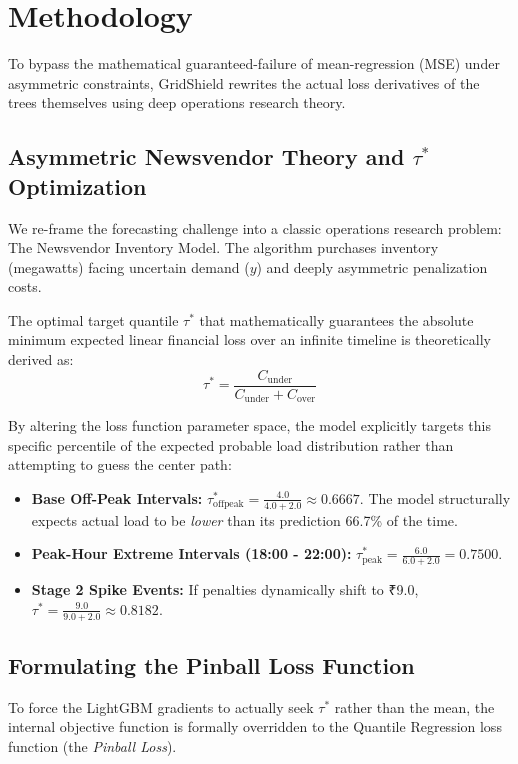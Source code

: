 \documentclass[11pt,a4paper]{article}
\begin{document}
\section{Methodology}

To bypass the mathematical guaranteed-failure of mean-regression (MSE) under asymmetric constraints, GridShield rewrites the actual loss derivatives of the trees themselves using deep operations research theory.

\subsection{Asymmetric Newsvendor Theory and $\tau^*$ Optimization}
We re-frame the forecasting challenge into a classic operations research problem: The Newsvendor Inventory Model. The algorithm purchases inventory (megawatts) facing uncertain demand ($y$) and deeply asymmetric penalization costs.

The optimal target quantile $\tau^*$ that mathematically guarantees the absolute minimum expected linear financial loss over an infinite timeline is theoretically derived as:
\begin{equation}
\tau^* = \frac{C_{\text{under}}}{C_{\text{under}} + C_{\text{over}}}
\end{equation}

By altering the loss function parameter space, the model explicitly targets this specific percentile of the expected probable load distribution rather than attempting to guess the center path:
\begin{itemize}
    \item \textbf{Base Off-Peak Intervals:} $\tau_{\text{offpeak}}^* = \frac{4.0}{4.0 + 2.0} \approx 0.6667$. The model structurally expects actual load to be \textit{lower} than its prediction 66.7\% of the time.
    \item \textbf{Peak-Hour Extreme Intervals (18:00 - 22:00):} $\tau_{\text{peak}}^* = \frac{6.0}{6.0 + 2.0} = 0.7500$.
    \item \textbf{Stage 2 Spike Events:} If penalties dynamically shift to ₹9.0, $\tau^* = \frac{9.0}{9.0 + 2.0} \approx 0.8182$.
\end{itemize}

\subsection{Formulating the Pinball Loss Function}
To force the LightGBM gradients to actually seek $\tau^*$ rather than the mean, the internal objective function is formally overridden to the Quantile Regression loss function (the \textit{Pinball Loss}).
\end{document}

